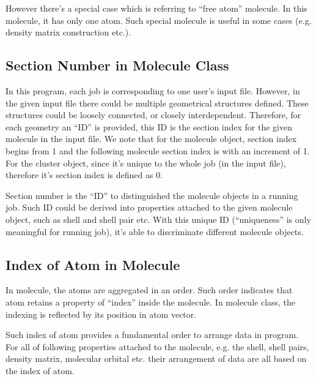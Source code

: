 However there's a special case which is referring to ``free atom''
molecule. In this molecule, it has only one atom. Such special molecule 
is useful in some cases (e.g. density matrix construction etc.).

\subsection{Section Number in Molecule Class}
%
%
In this program, each job is corresponding to one user's input file. However,
in the given input file there could be multiple geometrical structures defined.
These structures could be loosely connected, or closely interdependent. Therefore,
for each geometry an ``ID'' is provided, this ID is the section index for the 
given molecule in the input file. We note that for the molecule object, section
index begins from 1 and the following molecule section index is with an increment 
of 1. For the cluster object, since it's unique to the whole job (in the input file),
therefore it's section index is defined as 0.

Section number is the ``ID'' to distinguished the molecule objects in a running job.
Such ID could be derived into properties attached to the given molecule object, such
as shell and shell pair etc. With this unique ID (``uniqueness'' is only meaningful
for running job), it's able to discriminate different molecule objects.

\subsection{Index of Atom in Molecule}
%
%
In molecule, the atoms are aggregated in an order. Such order indicates that atom
retains a property of ``index'' inside the molecule. In molecule class, the
indexing is reflected by its position in atom vector.

Such index of atom provides a fundamental order to arrange data in program. For 
all of following properties attached to the molecule, e.g. the shell, shell pairs,
density matrix, molecular orbital etc. their arrangement of data are all based 
on the index of atom.



\begin{comment}

\section{Cluster}
%
%
In this program, cluster is used to express the ``super molecule''.  ``Super
molecule'' has two senses of meanings, first, it's the aggregation of
molecules; second, it defines how to link these molecules together.

Since cluster is a special case of molecule, therefore cluster class is a
derived class of molecule. The additional data in the cluster class is used to
express that ``How the cluster is formed by linking different molecular
pieces''. 


\end{comment}


